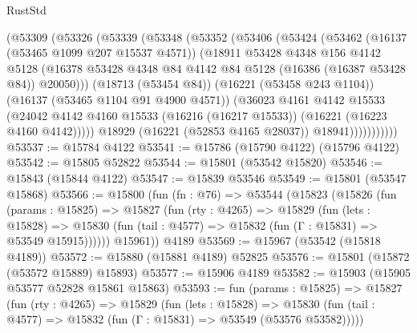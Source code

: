 \begin{lexlean}{RustStd}
\begin{coremodule}
              (@53309
                (@53326
                  (@53339
                    (@53348
                      (@53352
                        (@53406
                          (@53424
                            (@53462
                              (@16137 (@53465 @1099 @207 @15537 @4571))
                              (@18911
                                @53428
                                @4348
                                @156
                                @4142
                                @5128
                                (@16378
                                  @53428
                                  @4348
                                  @84
                                  @4142
                                  @84
                                  @5128
                                  (@16386 (@16387 @53428 @84))
                                  @20050)))
                            (@18713 (@53454 @84))
                            (@16221 (@53458 @243 @1104))
                            (@16137 (@53465 @1104 @91 @4900 @4571))
                            (@36023
                              @4161
                              @4142
                              @15533
                              (@24042
                                @4142
                                @4160
                                @15533
                                (@16216 (@16217 @15533))
                                (@16221 (@16223 @4160 @4142)))))
                          @18929
                          (@16221 (@52853 @4165 @28037))
                          @18941)))))))))))
@53537 := @15784 @4122
@53541 := @15786 (@15790 @4122) (@15796 @4122)
@53542 := @15805 @52822
@53544 := @15801 (@53542 @15820)
@53546 := @15843 (@15844 @4122)
@53547 := @15839 @53546
@53549 := @15801 (@53547 @15868)
@53566 := @15800
    (fun (fn : @76) =>
    @53544
      (@15823
        (@15826
          (fun (params : @15825) =>
          @15827
            (fun (rty : @4265) =>
            @15829
              (fun (lets : @15828) =>
              @15830 (fun (tail : @4577) => @15832 (fun (Γ : @15831) => @53549 @15915))))))
        @15961))
    @4189
@53569 := @15967 (@53542 (@15818 @4189))
@53572 := @15880 (@15881 @4189) @52825
@53576 := @15801 (@15872 (@53572 @15889) @15893)
@53577 := @15906 @4189
@53582 := @15903 (@15905 @53577 @52828 @15861 @15863)
@53593 := fun (params : @15825) =>
  @15827
    (fun (rty : @4265) =>
    @15829
      (fun (lets : @15828) =>
      @15830 (fun (tail : @4577) => @15832 (fun (Γ : @15831) => @53549 (@53576 @53582)))))

\end{coremodule}
\end{lexlean}
